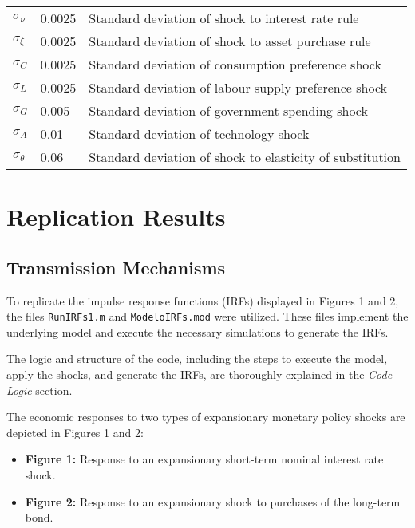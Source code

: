 \documentclass[12pt]{article}
\begin{document}
\begin{table}[t]
\begin{tabular}{lll}
        $\sigma_\nu$ & 0.0025 & Standard deviation of shock to interest rate rule \\
        $\sigma_{\xi}$ & 0.0025 & Standard deviation of shock to asset purchase rule \\
        $\sigma_C$ & 0.0025 & Standard deviation of consumption preference shock \\
        $\sigma_L$ & 0.0025 & Standard deviation of labour supply preference shock \\
        $\sigma_G$ & 0.005 & Standard deviation of government spending shock \\
        $\sigma_A$ & 0.01 & Standard deviation of technology shock \\
        $\sigma_\theta$ & 0.06 & Standard deviation of shock to elasticity of substitution \\
        \hline
    \end{tabular}
\end{table}



\section{Replication Results}


\subsection*{Transmission Mechanisms}

To replicate the impulse response functions (IRFs) displayed in Figures 1 and 2, the files \texttt{RunIRFs1.m} and \texttt{ModeloIRFs.mod} were utilized. These files implement the underlying model and execute the necessary simulations to generate the IRFs. 

The logic and structure of the code, including the steps to execute the model, apply the shocks, and generate the IRFs, are thoroughly explained in the \textit{Code Logic} section.


The economic responses to two types of expansionary monetary policy shocks are depicted in Figures 1 and 2:
\begin{itemize}
    \item \textbf{Figure 1:} Response to an expansionary short-term nominal interest rate shock.
    \item \textbf{Figure 2:} Response to an expansionary shock to purchases of the long-term bond.
\end{itemize}
\end{document}
